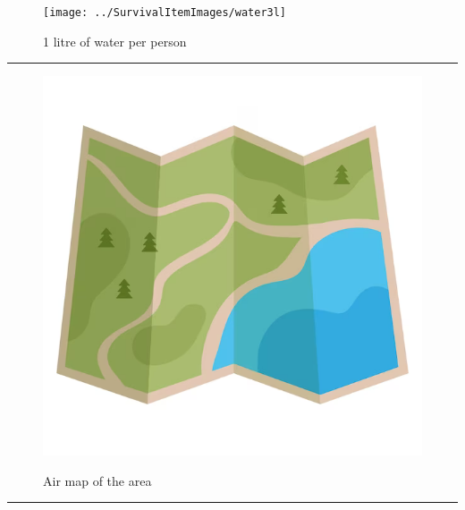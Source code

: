 \documentclass{article}
\begin{document}
    \begin{figure}[H]
        \centering
        \begin{minipage}{0.25\textwidth}
            \centering
            \texttt{[image: ../SurvivalItemImages/water3l]}
        \end{minipage}\hfill
        \begin{minipage}{0.7\textwidth}
            \centering
            \Large 1 litre of water per person
        \end{minipage}
    \end{figure}
    \vspace{-0.8em}
    \noindent\rule{\textwidth}{0.4pt}
            
    \begin{figure}[H]
        \centering
        \begin{minipage}{0.25\textwidth}
            \centering
            \includegraphics[width=\textwidth]{../SurvivalItemImages/aviationmap}
        \end{minipage}\hfill
        \begin{minipage}{0.7\textwidth}
            \centering
            \Large Air map of the area
        \end{minipage}
    \end{figure}
    \vspace{-0.8em}
    \noindent\rule{\textwidth}{0.4pt}
            
\end{document}

